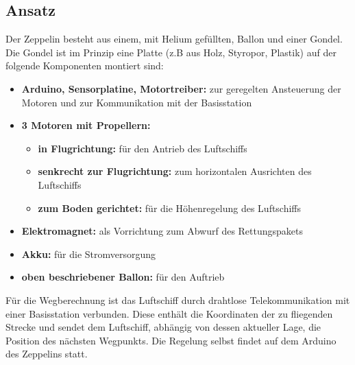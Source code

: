 \documentclass[lang=ngerman,inputenc=utf8,fontsize=10pt]{ldvarticle}
\begin{document}
\subsection*{Ansatz}
Der Zeppelin besteht aus einem, mit Helium gefüllten, Ballon und einer Gondel. Die Gondel ist im Prinzip eine Platte (z.B aus Holz, Styropor, Plastik) auf der folgende Komponenten montiert sind:
\begin{itemize}
\item \textbf{Arduino, Sensorplatine, Motortreiber:} zur geregelten Ansteuerung der Motoren und zur Kommunikation mit der Basisstation
\item \textbf{3 Motoren mit Propellern:}
\begin{itemize}
\item \textbf{in Flugrichtung:} für den Antrieb des Luftschiffs
\item \textbf{senkrecht zur Flugrichtung:} zum horizontalen Ausrichten des Luftschiffs
\item \textbf{zum Boden gerichtet:} für die Höhenregelung des Luftschiffs
\end{itemize}
\item \textbf{Elektromagnet:} als Vorrichtung zum Abwurf des Rettungspakets
\item \textbf{Akku:} für die Stromversorgung
\item \textbf{oben beschriebener Ballon:} für den Auftrieb
\end{itemize}

Für die Wegberechnung ist das Luftschiff durch drahtlose Telekommunikation mit einer Basisstation verbunden. Diese enthält die Koordinaten der zu fliegenden Strecke und sendet dem Luftschiff, abhängig von dessen aktueller Lage, die Position des nächsten Wegpunkts. Die Regelung selbst findet auf dem Arduino des Zeppelins statt.
\end{document}
